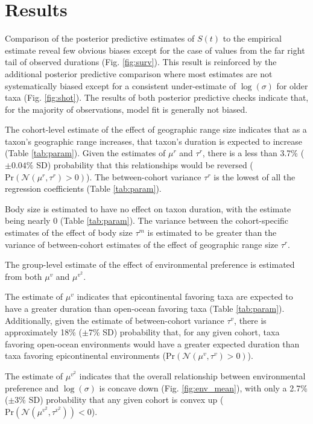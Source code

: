 \documentclass{article}
\begin{document}
\section{Results}

Comparison of the posterior predictive estimates of \(S(t)\) to the empirical estimate reveal few obvious biases except for the case of values from the far right tail of observed durations (Fig. \ref{fig:surv}). This result is reinforced by the additional posterior predictive comparison where most estimates are not systematically biased except for a consistent under-estimate of \(\log(\sigma)\) for older taxa (Fig. \ref{fig:shot}). The results of both posterior predictive checks indicate that, for the majority of observations, model fit is generally not biased.

The cohort-level estimate of the effect of geographic range size indicates that as a taxon's geographic range increases, that taxon's duration is expected to increase (Table \ref{tab:param}). Given the estimates of \(\mu^{r}\) and \(\tau^{r}\), there is a less than 3.7\% (\(\pm 0.04\%\) SD) probability that this relationships would be reversed (\(\mathrm{Pr}\left(\mathcal{N}(\mu^{r}, \tau^{r}) > 0\right)\)). The between-cohort variance \(\tau^{r}\) is the lowest of all the regression coefficients (Table \ref{tab:param}).

Body size is estimated to have no effect on taxon duration, with the estimate being nearly 0 (Table \ref{tab:param}). The variance between the cohort-specific estimates of the effect of body size \(\tau^{m}\) is estimated to be greater than the variance of between-cohort estimates of the effect of geographic range size \(\tau^{r}\). 

The group-level estimate of the effect of environmental preference is estimated from both \(\mu^{v}\) and \(\mu^{v^{2}}\). 

The estimate of \(\mu^{v}\) indicates that epicontinental favoring taxa are expected to have a greater duration than open-ocean favoring taxa (Table \ref{tab:param}). Additionally, given the estimate of between-cohort variance \(\tau^{v}\), there is approximately 18\% (\(\pm 7\%\) SD) probability that, for any given cohort, taxa favoring open-ocean environments would have a greater expected duration than taxa favoring epicontinental environments (\(\mathrm{Pr}\left(\mathcal{N}(\mu^{v}, \tau^{v}) > 0 \right)\)). 

The estimate of \(\mu^{v^{2}}\) indicates that the overall relationship between environmental preference and \(\log(\sigma)\) is concave down (Fig. \ref{fig:env_mean}), with only a 2.7\% (\(\pm 3\%\) SD) probability that any given cohort is convex up (\(\mathrm{Pr}\left(\mathcal{N}(\mu^{v^{2}}, \tau^{v^{2}})\right) < 0\)).
\end{document}
